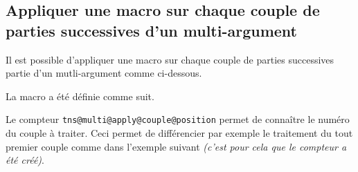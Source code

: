\documentclass[12pt,a4paper]{article}
\begin{document}

\subsection{Appliquer une macro sur chaque couple de parties successives d'un \og multi-argument \fg}


Il est possible d'appliquer une macro sur chaque couple de parties successives partie d'un mutli-argument comme ci-dessous.


\makeatletter
\newcommand\decocouple[2]{%
    (#1)[#2]%
}

\newcommand\multiapplycouple[1]{%
    \tns@multi@apply@couple{\decocouple}{#1}
}
\makeatother


\begin{latexex}
\multiapplycouple{1|2|3}
\end{latexex}


La macro  a été définie comme suit.

\begin{latexex-alone}
\newcommand\decocouple[2]{%
    (#1)[#2]%
}

\newcommand\multiapplycouple[1]{%
    \tns@multi@apply@couple{\decocouple}{#1}
}
\end{latexex-alone}





Le compteur \verb#tns@multi@apply@couple@position# permet de connaître le numéro du couple à traiter.
Ceci permet de différencier par exemple le traitement du tout premier couple comme dans l'exemple suivant \emph{(c'est pour cela que le compteur a été créé)}. 


\makeatletter
\newcommand\decocoupleafterfirst[2]{%
    \ifnum\value{tns@multi@apply@couple@position}=1
        \{#1-#2\}%
    \else%
        (#1)[#2]%
    \fi
}

\newcommand\multiapplycoupleafterone[1]{%
    \tns@multi@apply@couple{\decocoupleafterfirst}{#1}
}
\makeatother

\begin{latexex}
\multiapplycoupleafterone{1|2|3}
\end{latexex}
\end{document}
